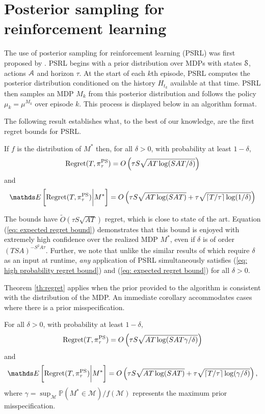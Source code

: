 \section{Posterior sampling for reinforcement learning}

The use of posterior sampling for reinforcement learning (PSRL) was first proposed by \cite{strens2000bayesian}.
PSRL begins with a prior distribution over MDPs with states $\mathcal{S}$, actions $\mathcal{A}$ and horizon $\tau$.  At the start of each $k$th episode, PSRL computes the posterior distribution conditioned on the history $H_{t_k}$ available at that time.  PSRL then samples an MDP $M_k$ from this posterior distribution and follows the policy $\mu_k = \mu^{M_k}$ over episode $k$.  This process is displayed below in an algorithm format.



The following result establishes what, to the best of our knowledge, are the first regret bounds for PSRL.
\begin{theorem}
\label{th:regret}
If $f$ is the distribution of $M^*$ then, for all $\delta>0$, with probability at least $1-\delta$,
\begin{equation} \label{eq: high probability regret bound}
\mathrm{Regret}(T, \pi^{\rm PS}_{\tau}) = O\left(\tau S\sqrt{AT\log(SAT/\delta)}\right)
\end{equation}
and 
\begin{equation}\label{eq: expected regret bound}
\Exp \left[ \mathrm{Regret}(T, \pi^{\rm PS}_{\tau}) \bigg\vert M^* \right] = O\left(\tau S\sqrt{AT\log(SAT)} +\tau\sqrt{\lceil T / \tau\rceil \log(1/\delta)} \right)
\end{equation}
\end{theorem}

The bounds have $\tilde{O}(\tau S\sqrt{AT})$ regret, which is close to state of the art. Equation (\ref{eq: expected regret bound}) demonstrates that this bound is enjoyed with extremely high confidence over the realized MDP $M^*$, even if $\delta$ is of order $(TSA)^{-S^2 A \tau}$. Further, we note that unlike the similar results of \cite{jaksch2010near,bartlett2009regal} which require $\delta$ as an input at runtime, \emph{any} application of PSRL simultaneously satisfies (\ref{eq: high probability regret bound}) and (\ref{eq: expected regret bound}) for all $\delta>0$.

Theorem \ref{th:regret} applies when the prior provided to the algorithm is consistent with the distribution of the MDP.  An immediate corollary accommodates cases where there is a prior misspecification.
\begin{corollary}
\label{co:mismatch}
For all $\delta>0$, with probability at least $1-\delta$,
$$\mathrm{Regret}(T, \pi^{\rm PS}_{\tau}) = O\left(\tau S\sqrt{AT\log(SAT \gamma /\delta)}\right)$$
and 
$$\Exp \left[ \mathrm{Regret}(T, \pi^{\rm PS}_{\tau}) \bigg\vert M^* \right] = O\left(\tau S\sqrt{AT\log(SAT)} +\tau\sqrt{\lceil T / \tau\rceil \log(\gamma/\delta)} \right),$$
where $\gamma = \sup_{\mathcal{M}} \mathbb{P}(M^* \in \mathcal{M}) / f(\mathcal{M})$ represents the maximum prior misspecification.
\end{corollary}

